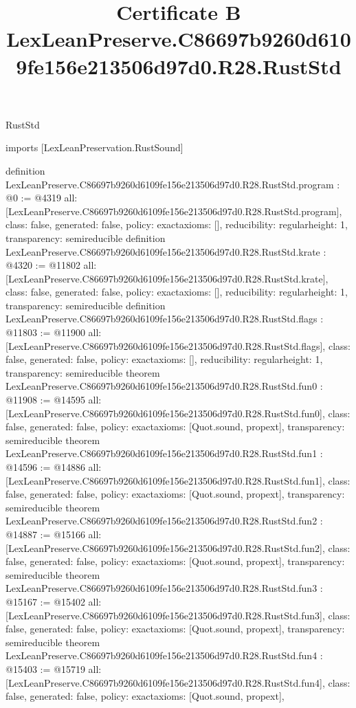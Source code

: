 \begin{lexlean}{RustStd}
\title{Certificate B LexLeanPreserve.C86697b9260d6109fe156e213506d97d0.R28.RustStd}
\begin{coremodule}
imports [LexLeanPreservation.RustSound]

definition LexLeanPreserve.C86697b9260d6109fe156e213506d97d0.R28.RustStd.program : @0 := @4319 {
  all: [LexLeanPreserve.C86697b9260d6109fe156e213506d97d0.R28.RustStd.program],
  class: false,
  generated: false,
  policy: exact{axioms: []},
  reducibility: regular{height: 1},
  transparency: semireducible
}
definition LexLeanPreserve.C86697b9260d6109fe156e213506d97d0.R28.RustStd.krate : @4320 := @11802 {
  all: [LexLeanPreserve.C86697b9260d6109fe156e213506d97d0.R28.RustStd.krate],
  class: false,
  generated: false,
  policy: exact{axioms: []},
  reducibility: regular{height: 1},
  transparency: semireducible
}
definition LexLeanPreserve.C86697b9260d6109fe156e213506d97d0.R28.RustStd.flags : @11803 := @11900 {
  all: [LexLeanPreserve.C86697b9260d6109fe156e213506d97d0.R28.RustStd.flags],
  class: false,
  generated: false,
  policy: exact{axioms: []},
  reducibility: regular{height: 1},
  transparency: semireducible
}
theorem LexLeanPreserve.C86697b9260d6109fe156e213506d97d0.R28.RustStd.fun0 : @11908 := @14595 {
  all: [LexLeanPreserve.C86697b9260d6109fe156e213506d97d0.R28.RustStd.fun0],
  class: false,
  generated: false,
  policy: exact{axioms: [Quot.sound, propext]},
  transparency: semireducible
}
theorem LexLeanPreserve.C86697b9260d6109fe156e213506d97d0.R28.RustStd.fun1 : @14596 := @14886 {
  all: [LexLeanPreserve.C86697b9260d6109fe156e213506d97d0.R28.RustStd.fun1],
  class: false,
  generated: false,
  policy: exact{axioms: [Quot.sound, propext]},
  transparency: semireducible
}
theorem LexLeanPreserve.C86697b9260d6109fe156e213506d97d0.R28.RustStd.fun2 : @14887 := @15166 {
  all: [LexLeanPreserve.C86697b9260d6109fe156e213506d97d0.R28.RustStd.fun2],
  class: false,
  generated: false,
  policy: exact{axioms: [Quot.sound, propext]},
  transparency: semireducible
}
theorem LexLeanPreserve.C86697b9260d6109fe156e213506d97d0.R28.RustStd.fun3 : @15167 := @15402 {
  all: [LexLeanPreserve.C86697b9260d6109fe156e213506d97d0.R28.RustStd.fun3],
  class: false,
  generated: false,
  policy: exact{axioms: [Quot.sound, propext]},
  transparency: semireducible
}
theorem LexLeanPreserve.C86697b9260d6109fe156e213506d97d0.R28.RustStd.fun4 : @15403 := @15719 {
  all: [LexLeanPreserve.C86697b9260d6109fe156e213506d97d0.R28.RustStd.fun4],
  class: false,
  generated: false,
  policy: exact{axioms: [Quot.sound, propext]},
}
\end{coremodule}
\end{lexlean}
